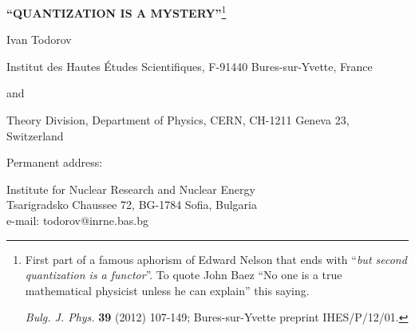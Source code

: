 


\def\vac{| 0 >}
\def\leftvac{< 0 |}
\def\C{\mathbb C}
\def\R{\mathbb R}
\def\S{\mathbb S}

\begin{center}

{\Large {\bf ``QUANTIZATION IS A MYSTERY''}}\footnote{First part of a famous
aphorism of Edward Nelson that ends with ``{\it but second quantization is a
functor}''. To quote John Baez \cite{B06} ``No one is a true mathematical
physicist unless he can explain'' this saying.

{\it Bulg. J. Phys.} {\bf 39} (2012) 107-149;
Bures-sur-Yvette preprint IHES/P/12/01.}

\vspace{4mm}

Ivan Todorov

Institut des Hautes \'Etudes Scientifiques, F-91440 Bures-sur-Yvette, France

and

Theory Division, Department of Physics, CERN, CH-1211 Geneva 23, Switzerland

Permanent address:
 
Institute for Nuclear Research and Nuclear Energy\\
Tsarigradsko Chaussee 72, BG-1784 Sofia, Bulgaria\\
e-mail: todorov@inrne.bas.bg 

\end{center}

\begin{abstract}

Expository notes which combine a historical survey of the development of quantum physics with a review of selected mathematical topics in quantization theory (addressed to students that are not complete novices in quantum mechanics).

After recalling in the introduction the early stages of the quantum revolution, and recapitulating 
in Sect. 2.1 some basic notions of symplectic geometry, we survey in Sect. 2.2 the 
so called {\it prequantization} thus preparing the ground for an outline of 
{\it geometric quantization} (Sect. 2.3). In Sect. 3 we apply the general theory
to the study of basic examples of {\it quantization of K\"ahler manifolds}. In Sect. 4 we review the Weyl and Wigner maps and the work of Groenewold and Moyal that laid the foundations of {\it quantum mechanics in phase space}, ending with a brief survey of the modern development of {\it deformation quantization}. Sect. 5
provides a review of {\it second quantization} and its mathematical interpretation. We point out that the treatment of (nonrelativistic) bound states requires going beyond the neat mathematical formalization of the concept of second quantization. An appendix is devoted to Pascual Jordan, the least known among the creators of  quantum mechanics and  the chief architect of the ``theory of quantized matter waves''.
\end{abstract}


